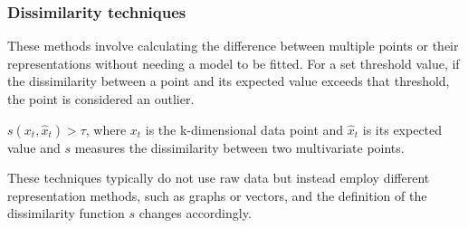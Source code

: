 \subsubsection{Dissimilarity techniques}
\label{ss:dissimilarity-univariate}
These methods involve calculating the difference between multiple points or their representations without needing a model to be fitted. For a set threshold value, if the dissimilarity between a point and its expected value exceeds that threshold, the point is considered an outlier. 
\begin{definition}\label{def:model-based-point-multivariate}
    $s(x_t, \hat{x}_t) > \tau $, where $x_t$ is the k-dimensional data point and $\hat{x}_t$ is its expected value and $s$ measures the dissimilarity between two multivariate points.
\end{definition}
These techniques typically do not use raw data but instead employ different representation methods, such as graphs or vectors, and the definition of the dissimilarity function $s$ changes accordingly.



